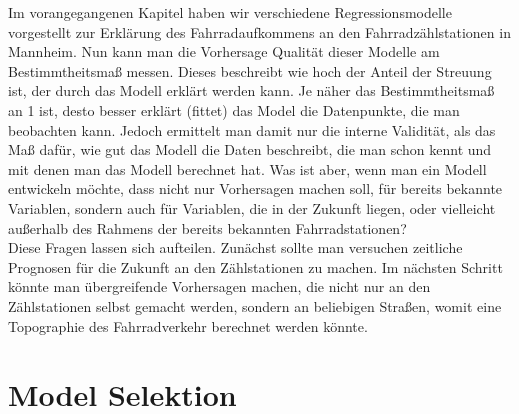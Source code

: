 \documentclass[a4paper,12pt]{thesis}
\begin{document}
Im vorangegangenen Kapitel haben wir verschiedene Regressionsmodelle vorgestellt zur Erklärung des Fahrradaufkommens an den Fahrradzählstationen in Mannheim. Nun kann man die Vorhersage Qualität dieser Modelle am Bestimmtheitsmaß messen. Dieses beschreibt wie hoch der Anteil der Streuung ist, der durch das Modell erklärt werden kann. Je näher das Bestimmtheitsmaß an 1 ist, desto besser erklärt (fittet) das Model die Datenpunkte, die man beobachten kann. Jedoch ermittelt man damit nur die interne Validität, als das Maß dafür, wie gut das Modell die Daten beschreibt, die man schon kennt und mit denen man das Modell berechnet hat. Was ist aber, wenn man ein Modell entwickeln möchte, dass nicht nur Vorhersagen machen soll, für bereits bekannte Variablen, sondern auch für Variablen, die in der Zukunft liegen, oder vielleicht außerhalb des Rahmens der bereits bekannten Fahrradstationen?\\
Diese Fragen lassen sich aufteilen. Zunächst sollte man versuchen zeitliche Prognosen für die Zukunft an den Zählstationen zu machen. Im nächsten Schritt könnte man übergreifende Vorhersagen machen, die nicht nur an den Zählstationen selbst gemacht werden, sondern an beliebigen Straßen, womit eine Topographie des Fahrradverkehr berechnet werden könnte.\\

\section{Model Selektion}
\end{document}
